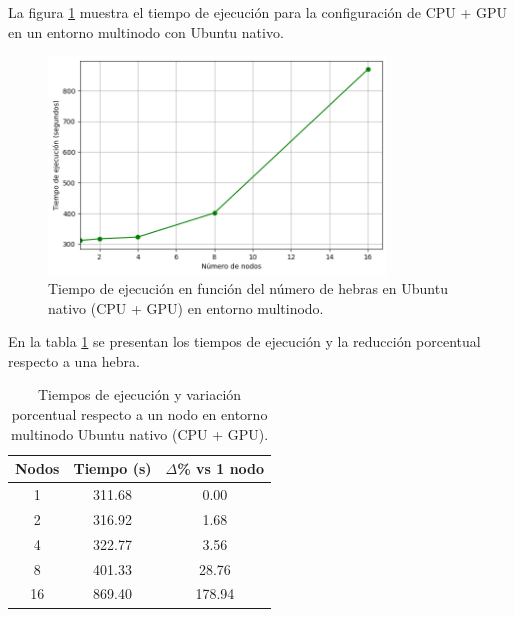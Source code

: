 La figura \ref{fig:multi-node_ubuntu_gpu_native_time} muestra el tiempo de ejecución para la configuración de CPU + GPU en un entorno multinodo con Ubuntu nativo.

\begin{figure}[H]
    \centering
    \includegraphics[width=0.8\textwidth]{imagenes/cap5/multi-node_ubuntu_gpu_native_time.png}
    \caption{Tiempo de ejecución en función del número de hebras en Ubuntu nativo (CPU + GPU) en entorno multinodo.}
    \label{fig:multi-node_ubuntu_gpu_native_time}
\end{figure}

En la tabla \ref{tab:multi-node_ubuntu_gpu_native} se presentan los tiempos de ejecución y la reducción porcentual respecto a una hebra.

\begin{table}[ht]
    \centering
    \begin{tabular}{|c|c|c|}
        \hline
        \textbf{Nodos} & \textbf{Tiempo (s)} & \textbf{$\Delta$\% vs 1 nodo} \\
        \hline
        1              & 311.68              & 0.00                          \\
        2              & 316.92              & 1.68                          \\
        4              & 322.77              & 3.56                          \\
        8              & 401.33              & 28.76                         \\
        16             & 869.40              & 178.94                        \\
        \hline
    \end{tabular}
    \caption{Tiempos de ejecución y variación porcentual respecto a un nodo en entorno multinodo Ubuntu nativo (CPU + GPU).}
    \label{tab:multi-node_ubuntu_gpu_native}
\end{table}

